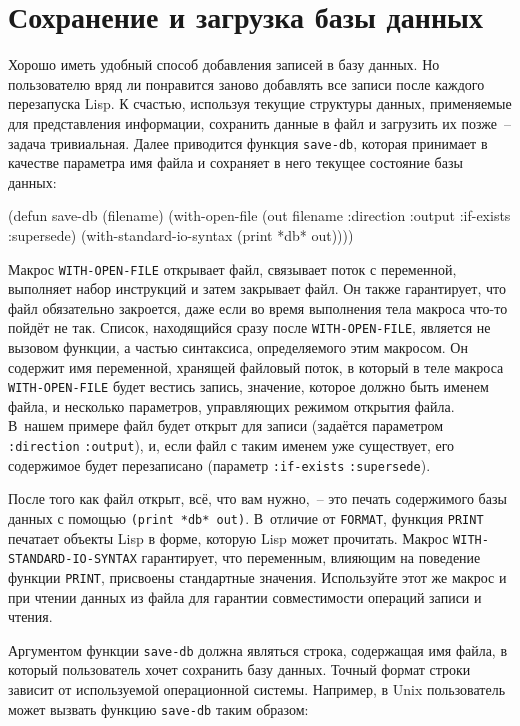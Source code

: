 \section{Сохранение и загрузка базы данных}

Хорошо иметь удобный способ добавления записей в базу данных. Но пользователю вряд ли
понравится заново добавлять все записи после каждого перезапуска Lisp. К счастью,
используя текущие структуры данных, применяемые для представления информации, сохранить
данные в файл и загрузить их позже~-- задача тривиальная. Далее приводится функция
\lstinline{save-db}, которая принимает в качестве параметра имя файла и сохраняет в него
текущее состояние базы данных:

\begin{myverb}
(defun save-db (filename)
  (with-open-file (out filename
                   :direction :output
                   :if-exists :supersede)
    (with-standard-io-syntax
      (print *db* out))))
\end{myverb}

Макрос \lstinline{WITH-OPEN-FILE} открывает файл, связывает поток с переменной, выполняет
набор инструкций и затем закрывает файл. Он также гарантирует, что файл обязательно
закроется, даже если во время выполнения тела макроса что-то пойдёт не так. Список,
находящийся сразу после \lstinline{WITH-OPEN-FILE}, является не вызовом функции, а частью
синтаксиса, определяемого этим макросом. Он содержит имя переменной, хранящей файловый
поток, в который в теле макроса \lstinline{WITH-OPEN-FILE} будет вестись запись, значение,
которое должно быть именем файла, и несколько параметров, управляющих режимом открытия
файла. В~нашем примере файл будет открыт для записи (задаётся параметром \lstinline{:direction}
\lstinline{:output}), и, если файл с таким именем уже существует, его содержимое будет
перезаписано (параметр \lstinline{:if-exists} \lstinline{:supersede}).

После того как файл открыт, всё, что вам нужно,~-- это печать содержимого базы данных с
помощью \lstinline{(print *db* out)}. В~отличие от \lstinline{FORMAT}, функция \lstinline{PRINT}
печатает объекты Lisp в форме, которую Lisp может прочитать. Макрос
\lstinline{WITH-STANDARD-IO-SYNTAX} гарантирует, что переменным, влияющим на поведение
функции \lstinline{PRINT}, присвоены стандартные значения. Используйте этот же макрос и при
чтении данных из файла для гарантии совместимости операций записи и чтения.

Аргументом функции \lstinline{save-db} должна являться строка, содержащая имя файла, в который
пользователь хочет сохранить базу данных. Точный формат строки зависит от используемой
операционной системы. Например, в Unix пользователь может вызвать функцию \lstinline{save-db}
таким образом:


